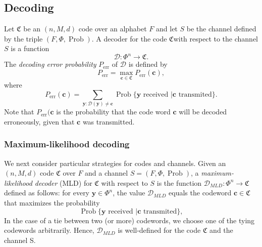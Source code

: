 \subsection{Decoding}
Let $\mathfrak{C}$ be an $(n,M,d)$ code over an alphabet $F$ and let $S$ be the channel defined by the triple $(F,\Phi,\operatorname{Prob})$. A decoder for the code $\mathfrak{C}$with respect to the channel $S$ is a function
\begin{equation}
\mathcal{D}: \Phi^n\to \mathfrak{C}.
\end{equation}
The \textit{decoding error probability} $P_{\text{err}}$ of $\mathcal{D}$ is defined by
\begin{equation}
P_{\text{err}} = \max_{\mathbf{c}\in\mathfrak{C}} P_{\text{err}}(\mathbf{c}),
\end{equation}
where 
\begin{equation}
P_{\text{err}}(\mathbf{c}) = \sum_{\mathbf{y}:\mathcal{D}(\mathbf{y})\neq \mathbf{c}} \operatorname{Prob}\{\mathbf{y}\text{ received }|\mathbf{c}\text{ transmited}\}.
\end{equation}
Note that $P_{\text{err}}(\mathbf{c}$ is the probability that the code word $\mathbf{c}$ will be decoded erroneously, given that $\mathbf{c}$ was transmitted.
\subsubsection*{Maximum-likelihood decoding}
We next consider particular strategies for codes and channels. Given an $(n,M,d)$ code $\mathfrak{C}$ over $F$ and a channel $S = (F,\Phi,\operatorname{Prob})$, a \textit{maximum-likelihood decoder} (MLD) for $\mathfrak{C}$ with respect to $S$ is the function $\mathcal{D}_{MLD}:\Phi^n\to \mathfrak{C}$ defined as follows: for every $\mathbf{y}\in \Phi^n$, the value  $\mathcal{D}_{MLD}$ equals the codeword $\mathbf{c}\in\mathfrak{C}$ that maximizes the probability
\begin{equation}
\operatorname{Prob}\{\mathbf{y}\text{ received }|\mathbf{c}\text{ transmited}\},
\end{equation}
In the case of a tie between two (or more) codewords, we choose one of the tying codewords arbitrarily. Hence, $\mathcal{D}_{MLD}$ is well-defined for the code $\mathfrak{C}$ and the channel S.
